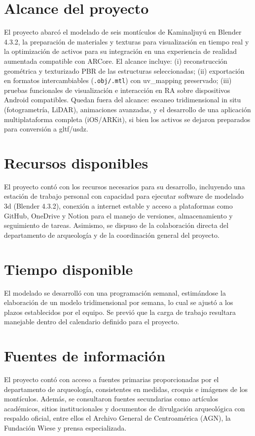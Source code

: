 
\section{Alcance del proyecto}
El proyecto abarcó el modelado de seis montículos de Kaminaljuyú en Blender 4.3.2, la preparación de materiales y texturas para visualización en tiempo real y la optimización de activos para su integración en una experiencia de realidad aumentada compatible con \gls{ARCore}. El alcance incluye: (i) reconstrucción geométrica y texturizado \gls{PBR} de las estructuras seleccionadas; (ii) exportación en formatos intercambiables (\texttt{.obj/.mtl}) con \gls{uv_mapping} preservado; (iii) pruebas funcionales de visualización e interacción en RA sobre dispositivos Android compatibles. Quedan fuera del alcance: escaneo tridimensional in situ (fotogrametría, LiDAR), animaciones avanzadas, y el desarrollo de una aplicación multiplataforma completa (iOS/ARKit), si bien los activos se dejaron preparados para conversión a \gls{gltf}/\gls{usdz}.

\section{Recursos disponibles}
El proyecto contó con los recursos necesarios para su desarrollo, incluyendo una estación de trabajo personal con capacidad para ejecutar software de modelado \gls{3d} (Blender 4.3.2), conexión a internet estable y acceso a plataformas como GitHub, OneDrive y Notion para el manejo de versiones, almacenamiento y seguimiento de tareas. Asimismo, se dispuso de la colaboración directa del departamento de arqueología y de la coordinación general del proyecto.

\section{Tiempo disponible}
El modelado se desarrolló con una programación semanal, estimándose la elaboración de un modelo tridimensional por semana, lo cual se ajustó a los plazos establecidos por el equipo. Se previó que la carga de trabajo resultara manejable dentro del calendario definido para el proyecto.

\section{Fuentes de información}
El proyecto contó con acceso a fuentes primarias proporcionadas por el departamento de arqueología, consistentes en medidas, croquis e imágenes de los montículos. Además, se consultaron fuentes secundarias como artículos académicos, sitios institucionales y documentos de divulgación arqueológica con respaldo oficial, entre ellos el Archivo General de Centroamérica (AGN), la Fundación Wiese y prensa especializada.

